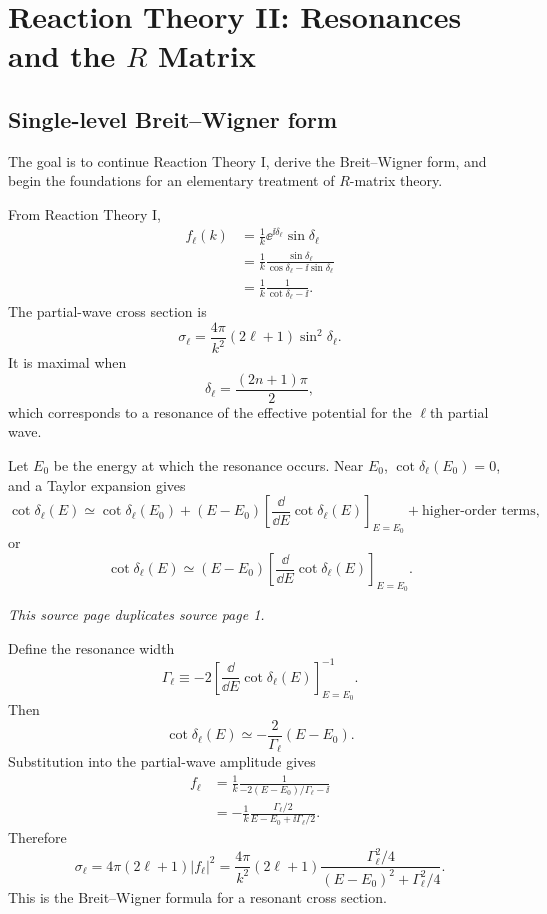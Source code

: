 \chapter{Reaction Theory II: Resonances and the \texorpdfstring{$R$}{R} Matrix}

\section{Single-level Breit--Wigner form}
The goal is to continue Reaction Theory I, derive the Breit--Wigner form, and begin the foundations for an elementary treatment of $R$-matrix theory.

From Reaction Theory I,
\begin{align*}
  f_\ell(k)
  &=\frac{1}{k}\ee^{\ii\delta_\ell}\sin\delta_\ell\\
  &=\frac{1}{k}\frac{\sin\delta_\ell}
  {\cos\delta_\ell-\ii\sin\delta_\ell}\\
  &=\frac{1}{k}\frac{1}{\cot\delta_\ell-\ii}.
  \tag{1}
\end{align*}
The partial-wave cross section is
\begin{equation*}
  \sigma_\ell=\frac{4\pi}{k^2}(2\ell+1)\sin^2\delta_\ell.
  \tag{2}
\end{equation*}
It is maximal when
\[
  \delta_\ell=\frac{(2n+1)\pi}{2},
\]
which corresponds to a resonance of the effective potential for the $\ell$th partial wave.

Let $E_0$ be the energy at which the resonance occurs.  Near $E_0$, $\cot\delta_\ell(E_0)=0$, and a Taylor expansion gives
\[
  \cot\delta_\ell(E)
  \simeq \cot\delta_\ell(E_0)
  +(E-E_0)\left[\frac{\dd}{\dd E}\cot\delta_\ell(E)\right]_{E=E_0}
  +\text{higher-order terms},
\]
or
\begin{equation*}
  \cot\delta_\ell(E)
  \simeq(E-E_0)\left[\frac{\dd}{\dd E}\cot\delta_\ell(E)\right]_{E=E_0}.
  \tag{3}
\end{equation*}

\textit{This source page duplicates source page 1.}

Define the resonance width
\begin{equation*}
  \Gamma_\ell
  \equiv-2\left[\frac{\dd}{\dd E}\cot\delta_\ell(E)\right]^{-1}_{E=E_0}.
  \tag{4}
\end{equation*}
Then
\[
  \cot\delta_\ell(E)\simeq-\frac{2}{\Gamma_\ell}(E-E_0).
\]
Substitution into the partial-wave amplitude gives
\begin{align*}
  f_\ell
  &=\frac{1}{k}\frac{1}{-2(E-E_0)/\Gamma_\ell-\ii}\\
  &=-\frac{1}{k}
  \frac{\Gamma_\ell/2}{E-E_0+\ii\Gamma_\ell/2}.
  \tag{5}
\end{align*}
Therefore
\begin{equation*}
  \sigma_\ell
  =4\pi(2\ell+1)|f_\ell|^2
  =\frac{4\pi}{k^2}(2\ell+1)
  \frac{\Gamma_\ell^2/4}
  {(E-E_0)^2+\Gamma_\ell^2/4}.
  \tag{6}
\end{equation*}
This is the Breit--Wigner formula for a resonant cross section.

